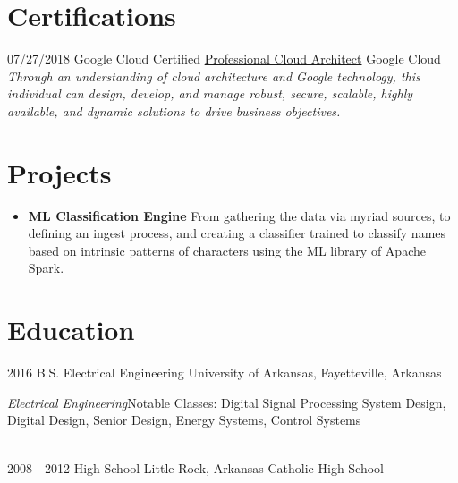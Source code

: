 \documentclass[]{friggeri-cv}
\begin{document}
\section{Certifications}
\begin{entrylist}
 \entry
   {07/27/2018}
   {Google Cloud Certified \href{https://www.credential.net/nwr1hwwq?key=22e8d9d6b741e6ba83b36d6912d092d5bcda893c26b970eed35f9a70da86a45e}{Professional Cloud Architect}}
   {Google Cloud}
   {\textit{Through an understanding of cloud architecture and Google technology, this individual can design, develop, and manage robust, secure, scalable, highly available, and dynamic solutions to drive business objectives.}}
\end{entrylist}

\section{Projects}
\begin{itemize}
  \item
    {\textbf{ML Classification Engine} From gathering the data via myriad sources, to defining an ingest process, and creating a classifier trained to classify names based on intrinsic patterns of characters using the ML library of Apache Spark.}
\end{itemize}

\section{Education}
\begin{entrylist}
  \entry
    {2016}
    {B.S. Electrical Engineering}
    {University of Arkansas, Fayetteville, Arkansas}
    {\raggedright{\textit{Electrical Engineering}}\break Notable Classes: Digital Signal Processing System Design, Digital Design, Senior Design, Energy Systems, Control Systems\\}
    \\
  \entry
    {2008 - 2012}
    {High School}
    {Little Rock, Arkansas}
    {Catholic High School}
\end{entrylist}
\end{document}
